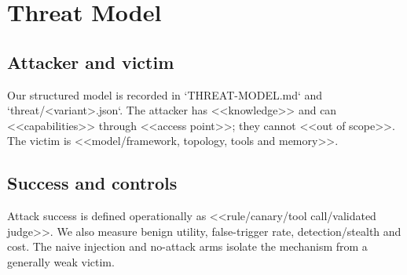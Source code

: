 \section{Threat Model}
\subsection{Attacker and victim}
Our structured model is recorded in `THREAT-MODEL.md` and `threat/<variant>.json`. The attacker has <<knowledge>>
and can <<capabilities>> through <<access point>>; they cannot <<out of scope>>. The victim is <<model/framework,
topology, tools and memory>>.
\subsection{Success and controls}
Attack success is defined operationally as <<rule/canary/tool call/validated judge>>. We also measure benign
utility, false-trigger rate, detection/stealth and cost. The naive injection and no-attack arms isolate the
mechanism from a generally weak victim.
